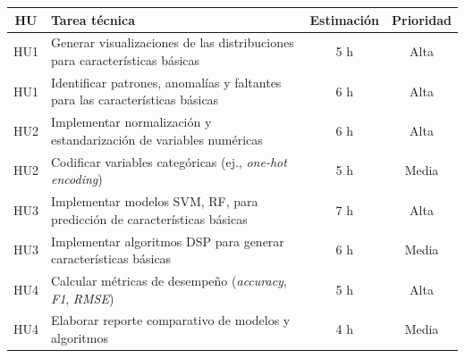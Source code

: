 \documentclass[
11pt, %
]{charter}
\begin{document}
\begin{table}[htpb]
\centering
\begin{tabularx}{\linewidth}{@{}|c|X|c|c|@{}}
\hline
\rowcolor[HTML]{C0C0C0}
HU & Tarea técnica & Estimación & Prioridad \\ \hline
HU1 & Generar visualizaciones de las distribuciones para características básicas & 5 h & Alta \\ \hline
HU1 & Identificar patrones, anomalías y faltantes para las características básicas & 6 h & Alta \\ \hline

HU2 & Implementar normalización y estandarización de variables numéricas & 6 h & Alta \\ \hline
HU2 & Codificar variables categóricas (ej., \textit{one-hot encoding}) & 5 h & Media \\ \hline

HU3 & Implementar modelos SVM, RF, para predicción de características básicas & 7 h & Alta \\ \hline
HU3 & Implementar algoritmos DSP para generar características básicas & 6 h & Media \\ \hline

HU4 & Calcular métricas de desempeño (\textit{accuracy}, \textit{F1}, \textit{RMSE}) & 5 h & Alta \\ \hline
HU4 & Elaborar reporte comparativo de modelos y algoritmos & 4 h & Media \\ \hline

\end{tabularx}
\end{table}

\newpage
\end{document}
